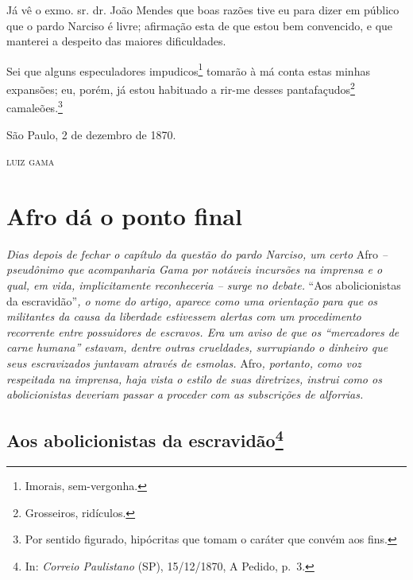 {Já vê o exmo. sr. dr. João Mendes que boas razões tive eu para dizer em
público que o pardo Narciso é livre; afirmação esta de que estou bem
convencido, e que manterei a despeito das maiores dificuldades.

Sei que alguns especuladores impudicos\footnote{ Imorais,
  sem-vergonha.} tomarão à má conta estas minhas expansões; eu, porém,
já estou habituado a rir-me desses pantafaçudos\footnote{
  Grosseiros, ridículos.} camaleões\textsuperscript{⁠}.\footnote{
  Por sentido figurado, hipócritas que tomam o caráter que convém aos
  fins.}
\begin{flushright}
São Paulo, 2 de dezembro de 1870.

\textsc{luiz gama}
\end{flushright}
\part{Afro dá o ponto final}

\begin{didascalia}
\emph{Dias depois de fechar o capítulo da questão do pardo Narciso, um
certo} Afro \emph{-- pseudônimo que acompanharia Gama por notáveis
incursões na imprensa e o qual, em vida, implicitamente reconheceria --
surge no debate.} ``Aos abolicionistas da escravidão''\emph{, o nome do
artigo, aparece como uma orientação para que os militantes da causa da
liberdade estivessem alertas com um procedimento recorrente entre
possuidores de escravos. Era um aviso de que os ``mercadores de carne
humana'' estavam, dentre outras crueldades, surrupiando o dinheiro que
seus escravizados juntavam através de esmolas.} Afro\emph{, portanto,
como voz respeitada na imprensa, haja vista o estilo de suas diretrizes,
instrui como os abolicionistas deveriam passar a proceder com as
subscrições de alforrias.}
\end{didascalia}

\chapter{Aos abolicionistas da escravidão\footnote{ In: \emph{Correio Paulistano} (SP), 15/12/1870, A Pedido,
  p.~3.}} %

}
